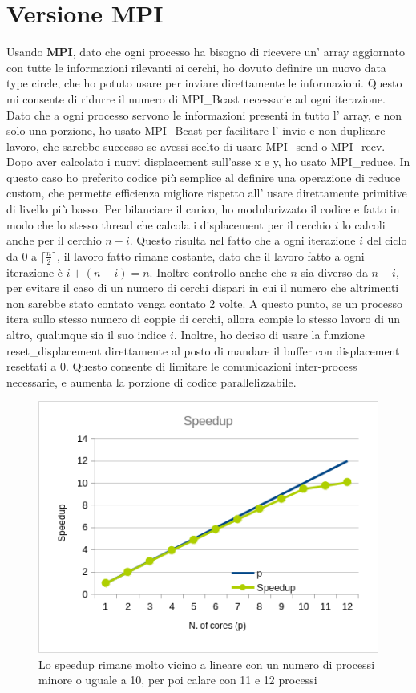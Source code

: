 \documentclass[a4paper,11pt, twoside]{report}
\begin{document}
\section*{Versione MPI}
Usando \textbf{MPI}, dato che ogni processo ha bisogno di ricevere un' array aggiornato con tutte le informazioni rilevanti ai cerchi, 
ho dovuto definire un nuovo data type circle, che ho potuto usare per inviare direttamente le informazioni. 
Questo mi consente di ridurre il numero di MPI\_Bcast necessarie ad ogni iterazione.
Dato che a ogni processo servono le informazioni presenti in tutto l' array, e non solo una porzione, ho usato MPI\_Bcast per facilitare l' invio e non duplicare lavoro,
che sarebbe successo se avessi scelto di usare MPI\_send o  MPI\_recv.
Dopo aver calcolato i nuovi displacement sull'asse x e y, ho usato MPI\_reduce.
In questo caso ho preferito codice più semplice al definire una operazione di reduce custom,
che permette efficienza migliore rispetto all' usare direttamente primitive di livello più basso.
Per bilanciare il carico, ho modularizzato il codice e fatto in modo che lo stesso thread che calcola i displacement per il cerchio $i$ lo calcoli anche per il cerchio $n-i$.
Questo risulta nel fatto che a ogni iterazione $i$ del ciclo da $0$ a $\lceil \frac{n}{2} \rceil$, il lavoro fatto rimane costante, dato che il lavoro fatto a ogni iterazione è $i + (n-i) = n$.
Inoltre controllo anche che $n$ sia diverso da $n-i$, per evitare il caso di un numero di cerchi dispari in cui il numero che altrimenti non sarebbe stato contato venga contato 2 volte.
A questo punto, se un processo itera sullo stesso numero di coppie di cerchi, allora compie lo stesso lavoro di un altro, qualunque sia il suo indice $i$.
Inoltre, ho deciso di usare la funzione reset\_displacement direttamente al posto di mandare il buffer con displacement resettati a 0.
Questo consente di limitare le comunicazioni inter-process necessarie, e aumenta la porzione di codice parallelizzabile.
\begin{figure}
    \includegraphics[scale=0.5]{images/mpi_speedup.png}
    \caption[]{Lo speedup rimane molto vicino a lineare con un numero di processi minore o uguale a 10, per poi calare con 11 e 12 processi}
\end{figure}
\end{document}
